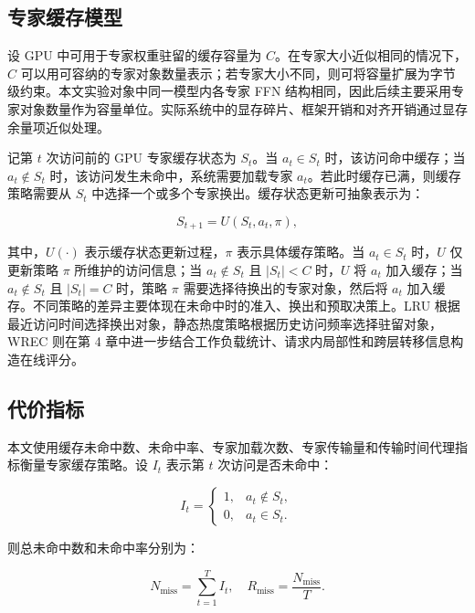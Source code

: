 \subsection{专家缓存模型}

设 GPU 中可用于专家权重驻留的缓存容量为 $C$。在专家大小近似相同的情况下，$C$ 可以用可容纳的专家对象数量表示；若专家大小不同，则可将容量扩展为字节级约束。本文实验对象中同一模型内各专家 FFN 结构相同，因此后续主要采用专家对象数量作为容量单位。实际系统中的显存碎片、框架开销和对齐开销通过显存余量项近似处理。

记第 $t$ 次访问前的 GPU 专家缓存状态为 $S_t$。当 $a_t\in S_t$ 时，该访问命中缓存；当 $a_t\notin S_t$ 时，该访问发生未命中，系统需要加载专家 $a_t$。若此时缓存已满，则缓存策略需要从 $S_t$ 中选择一个或多个专家换出。缓存状态更新可抽象表示为：

\begin{equation}
    \label{equ:cache-state}
    S_{t+1}=U(S_t,a_t,\pi),
\end{equation}

其中，$U(\cdot)$ 表示缓存状态更新过程，$\pi$ 表示具体缓存策略。当 $a_t\in S_t$ 时，$U$ 仅更新策略 $\pi$ 所维护的访问信息；当 $a_t\notin S_t$ 且 $|S_t|<C$ 时，$U$ 将 $a_t$ 加入缓存；当 $a_t\notin S_t$ 且 $|S_t|=C$ 时，策略 $\pi$ 需要选择待换出的专家对象，然后将 $a_t$ 加入缓存。不同策略的差异主要体现在未命中时的准入、换出和预取决策上。LRU 根据最近访问时间选择换出对象，静态热度策略根据历史访问频率选择驻留对象，WREC 则在第 4 章中进一步结合工作负载统计、请求内局部性和跨层转移信息构造在线评分。

\subsection{代价指标}

本文使用缓存未命中数、未命中率、专家加载次数、专家传输量和传输时间代理指标衡量专家缓存策略。设 $I_t$ 表示第 $t$ 次访问是否未命中：

\begin{equation}
    \label{equ:miss-indicator}
    I_t=
    \begin{cases}
        1, & a_t\notin S_t,\\
        0, & a_t\in S_t.
    \end{cases}
\end{equation}

则总未命中数和未命中率分别为：

\begin{equation}
    \label{equ:miss-rate}
    N_{\mathrm{miss}}=\sum_{t=1}^{T} I_t,\quad
    R_{\mathrm{miss}}=\frac{N_{\mathrm{miss}}}{T}.
\end{equation}

